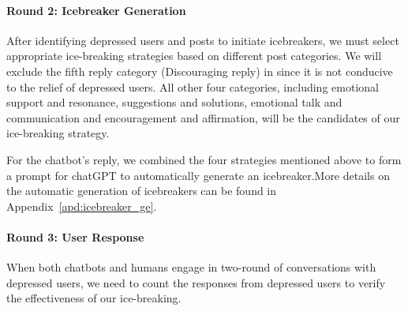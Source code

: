 \paragraph{Round 2: Icebreaker Generation}
After identifying depressed users and posts to initiate icebreakers, we must select appropriate ice-breaking strategies based on different post categories. We will exclude the fifth reply category (Discouraging reply) in  since it is not conducive to the 
relief of depressed users. All other four categories, including emotional support and resonance, suggestions and solutions, emotional talk and communication and encouragement and affirmation, will be the
candidates of our ice-breaking strategy. 

For the chatbot's reply, we combined the four strategies mentioned above to form a prompt for chatGPT to automatically generate an icebreaker.More details on the automatic generation of icebreakers can be found in Appendix~\ref{apd:icebreaker_ge}.

\paragraph{Round 3: User Response}
When both chatbots and humans engage in two-round of conversations with depressed users, we need to count the responses from depressed users to verify the effectiveness of our ice-breaking.